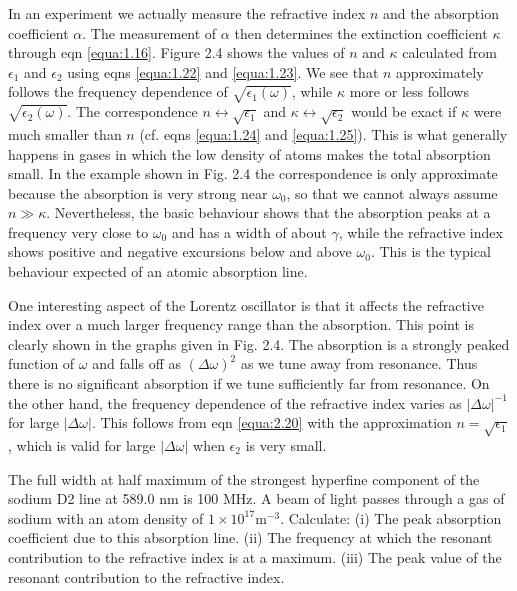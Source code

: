 \documentclass[12pt]{book}
\def\m{\mathrm{m}}
\begin{document}
In an experiment we actually measure the refractive index $n$ and the absorption coefficient $\alpha$. The measurement of $\alpha$ then determines the extinction coefficient $\kappa$ through eqn \ref{equa:1.16}. Figure 2.4 shows the values of $n$ and $\kappa$ calculated from $\epsilon_1$ and $\epsilon_2$ using eqns \ref{equa:1.22} and \ref{equa:1.23}. We see that $n$ approximately follows the frequency dependence of $\sqrt{\epsilon_1(\omega)}$, while $\kappa$ more or less follows $\sqrt{\epsilon_2(\omega)}$. The correspondence $n\leftrightarrow\sqrt{\epsilon_1}$ and $\kappa\leftrightarrow\sqrt{\epsilon_2}$ would be exact if $\kappa$ were much smaller than $n$ (cf. eqns \ref{equa:1.24} and \ref{equa:1.25}). This is what generally happens in gases in which the low density of atoms makes the total absorption small. In the example shown in Fig. 2.4 the correspondence is only approximate because the absorption is very strong near $\omega_0$, so that we cannot always assume $n\gg\kappa$. Nevertheless, the basic behaviour shows that the absorption peaks at a frequency very close to $\omega_0$ and has a width of about $\gamma$, while the refractive index shows positive and negative excursions below and above $\omega_0$. This is the typical behaviour expected of an atomic absorption line.

One interesting aspect of the Lorentz oscillator is that it affects the refractive index over a much larger frequency range than the absorption. This point is clearly shown in the graphs given in Fig. 2.4. The absorption is a strongly peaked function of $\omega$ and falls off as $(\Delta\omega)^2$ as we tune away from resonance. Thus there is no significant absorption if we tune sufficiently far from resonance. On the other hand, the frequency dependence of the refractive index varies as $|\Delta\omega|^{-1}$ for large $|\Delta\omega|$. This follows from eqn \ref{equa:2.20} with the approximation $n=\sqrt{\epsilon_1}$, which is valid for large $|\Delta\omega|$ when $\epsilon_2$ is very small.

\begin{Exercise}
  The full width at half maximum of the strongest hyperfine component of the sodium D2 line at 589.0 nm is 100 MHz. A beam of light passes through a gas of sodium with an atom density of $1\times10^{17} \m^{-3}$. Calculate: (i) The peak absorption coefficient due to this absorption line. (ii) The frequency at which the resonant contribution to the refractive index is at a maximum. (iii) The peak value of the resonant contribution to the refractive index.
\end{Exercise}
\end{document}
